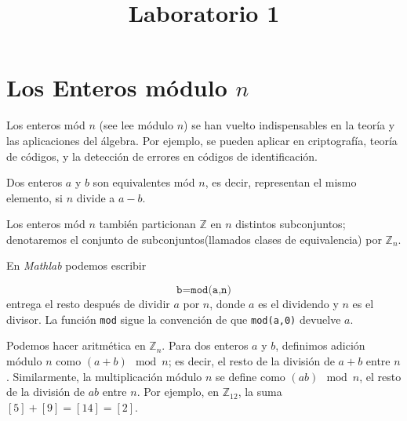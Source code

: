 \documentclass[a4paper]{article}
\title{Laboratorio 1}
\date{}
\begin{document}
\maketitle
\thispagestyle{fancy}

\section*{Los Enteros módulo $n$}
\vspace{0.2 cm}

Los enteros mód $n$ (see lee m\'odulo $n$) se han vuelto indispensables en la teoría y las aplicaciones del álgebra. Por ejemplo, se pueden aplicar en criptografía, teoría de códigos, y la detección de errores en códigos de identificación.

Dos enteros $a$ y $b$ son equivalentes mód $n$, es decir, representan el mismo elemento, si 
$n$ divide a $a-b$.

Los enteros mód $n$ también particionan 
$\mathbb{Z}$ en $n$ distintos subconjuntos; denotaremos el conjunto de subconjuntos(llamados clases de equivalencia) por $\mathbb{Z}_n$.

En \textit{Mathlab} podemos escribir

\[\texttt{b=mod(a,n)}\]
entrega el resto después de dividir $a$ por $n$, donde $a$ es el dividendo y $n$ es el divisor. La función \texttt{mod} sigue la convención de que \texttt{mod(a,0)} devuelve $a$.

Podemos hacer aritmética en $\mathbb{Z}_n$. Para dos enteros $a$ y $b$, definimos adición módulo $n$ como $(a+b)\mod n$; es decir, el resto de la división de $a+b$ entre $n$. Similarmente, la multiplicación módulo $n$ se define como $(ab)\mod n$, el resto de la división de $ab$ entre $n$. Por ejemplo, en $\mathbb{Z}_{12}$, la suma $[5]+[9]=[14]=[2]$.
\end{document}
